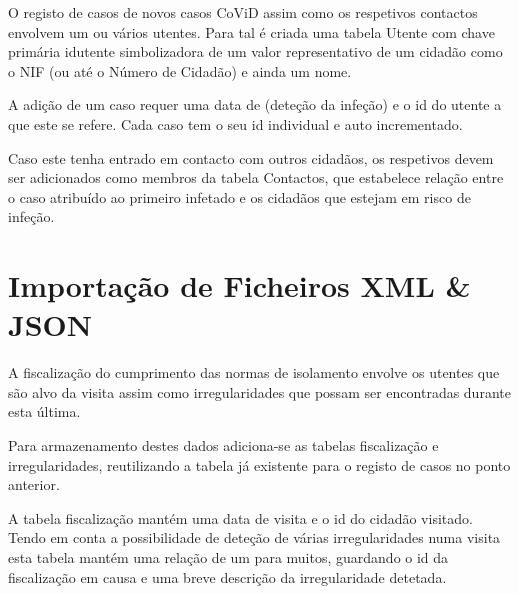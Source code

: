 O registo de casos de novos casos CoViD assim como os respetivos contactos envolvem um ou vários utentes. Para tal é criada uma tabela Utente com chave primária idutente simbolizadora de um valor representativo de um cidadão como o NIF (ou até o Número de Cidadão) e ainda um nome.

A adição de um caso requer uma data de (deteção da infeção) e o id do utente a que este se refere. Cada caso tem o seu id individual e auto incrementado.

Caso este tenha entrado em contacto com outros cidadãos, os respetivos devem ser adicionados como membros da tabela Contactos, que estabelece relação entre o caso atribuído ao primeiro infetado e os cidadãos que estejam em risco de infeção. 

\vfill
\section{Importação de Ficheiros XML \& JSON}

A fiscalização do cumprimento das normas de isolamento envolve os utentes que são alvo da visita assim como irregularidades que possam ser encontradas durante esta última.

Para armazenamento destes dados adiciona-se as tabelas fiscalização e irregularidades, reutilizando a tabela já existente para o registo de casos no ponto anterior.

A tabela fiscalização mantém uma data de visita e o id do cidadão visitado.
Tendo em conta a possibilidade de deteção de várias irregularidades numa visita esta tabela mantém uma relação de um para muitos, guardando o id da fiscalização em causa e uma breve descrição da irregularidade detetada.